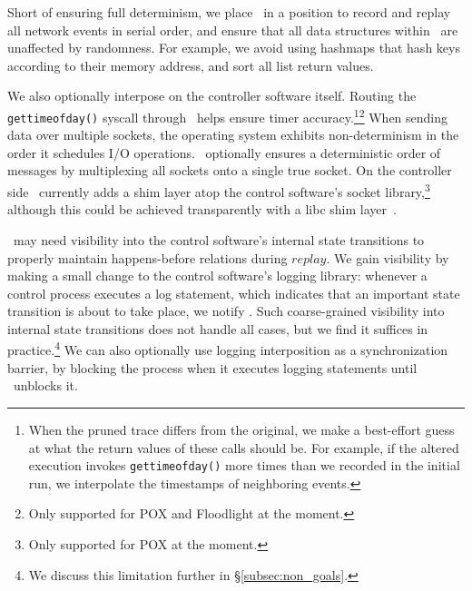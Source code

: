 Short of ensuring full determinism, we place \projectname~in a position to
record and replay all network events in serial order, and ensure that all
data structures within \projectname~are unaffected by randomness. For example,
we avoid using hashmaps that hash keys according to their memory address,
and sort all list return values.

We also optionally interpose on the controller software itself.
Routing the {\tt gettimeofday()} syscall through \projectname~helps ensure timer
accuracy.\footnote{When the pruned trace differs from the original, we make a
best-effort guess at what the return values of these calls should be. For example,
if the altered execution invokes {\tt gettimeofday()} more times than we recorded
in the initial run, we interpolate the timestamps of neighboring events.}\footnote{Only
supported for POX and Floodlight at the moment.\label{fn:pox_fl}} When sending data over multiple sockets, the operating system exhibits
non-determinism in the order it schedules I/O operations.
\projectname~optionally ensures a deterministic order of messages
by multiplexing all sockets
onto a single true socket. On the controller side \projectname~currently
adds a shim layer atop the control
software's socket library,\footnote{Only supported for POX at the moment.} although this
could be achieved transparently with a libc shim layer~\cite{Geels:2006:RDD:1267359.1267386}.

\projectname~may need visibility into the control software's internal state
transitions to properly maintain happens-before relations during $replay$. We
gain visibility by making a
small change to the control software's logging library: whenever a control process executes a log
statement, which indicates that an important state transition is about to take
place, we notify \projectname. Such coarse-grained visibility into internal
state transitions does not handle all cases, but we find it suffices in practice.\footnote{We discuss this limitation further in \S\ref{subsec:non_goals}.}
We can also optionally use
logging interposition as a
synchronization barrier, by blocking the process when it executes logging statements
until \projectname~unblocks it.


